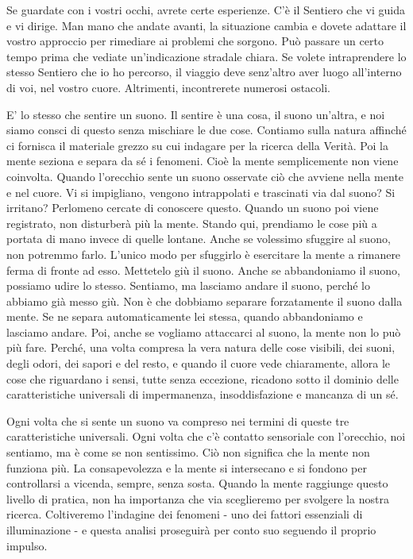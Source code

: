 
Se guardate con i vostri occhi, avrete certe esperienze. C'è il Sentiero
che vi guida e vi dirige. Man mano che andate avanti, la situazione
cambia e dovete adattare il vostro approccio per rimediare ai problemi
che sorgono. Può passare un certo tempo prima che vediate un'indicazione
stradale chiara. Se volete intraprendere lo stesso Sentiero che io ho
percorso, il viaggio deve senz'altro aver luogo all'interno di voi, nel
vostro cuore. Altrimenti, incontrerete numerosi ostacoli.

E' lo stesso che sentire un suono. Il sentire è una cosa, il suono
un'altra, e noi siamo consci di questo senza mischiare le due cose.
Contiamo sulla natura affinché ci fornisca il materiale grezzo su cui
indagare per la ricerca della Verità. Poi la mente seziona e separa da
sé i fenomeni. Cioè la mente semplicemente non viene coinvolta. Quando
l'orecchio sente un suono osservate ciò che avviene nella mente e nel
cuore. Vi si impigliano, vengono intrappolati e trascinati via dal
suono? Si irritano? Perlomeno cercate di conoscere questo. Quando un
suono poi viene registrato, non disturberà più la mente. Stando qui,
prendiamo le cose più a portata di mano invece di quelle lontane. Anche
se volessimo sfuggire al suono, non potremmo farlo. L'unico modo per
sfuggirlo è esercitare la mente a rimanere ferma di fronte ad esso.
Mettetelo giù il suono. Anche se abbandoniamo il suono, possiamo udire
lo stesso. Sentiamo, ma lasciamo andare il suono, perché lo abbiamo già
messo giù. Non è che dobbiamo separare forzatamente il suono dalla
mente. Se ne separa automaticamente lei stessa, quando abbandoniamo e
lasciamo andare. Poi, anche se vogliamo attaccarci al suono, la mente
non lo può più fare. Perché, una volta compresa la vera natura delle
cose visibili, dei suoni, degli odori, dei sapori e del resto, e quando
il cuore vede chiaramente, allora le cose che riguardano i sensi, tutte
senza eccezione, ricadono sotto il dominio delle caratteristiche
universali di impermanenza, insoddisfazione e mancanza di un sé.

Ogni volta che si sente un suono va compreso nei termini di queste tre
caratteristiche universali. Ogni volta che c'è contatto sensoriale con
l'orecchio, noi sentiamo, ma è come se non sentissimo. Ciò non significa
che la mente non funziona più. La consapevolezza e la mente si
intersecano e si fondono per controllarsi a vicenda, sempre, senza
sosta. Quando la mente raggiunge questo livello di pratica, non ha
importanza che via sceglieremo per svolgere la nostra ricerca.
Coltiveremo l'indagine dei fenomeni - uno dei fattori essenziali di
illuminazione - e questa analisi proseguirà per conto suo seguendo il
proprio impulso.

